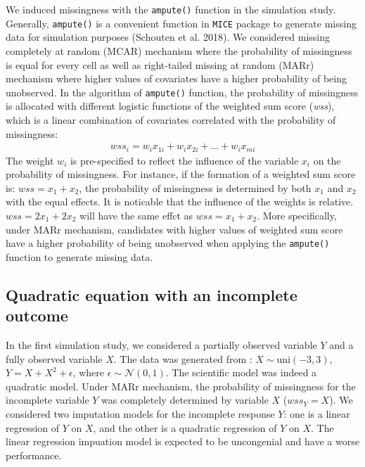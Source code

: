 \documentclass[12pt, fullpage, a4paper]{article}
\begin{document}
We induced missingness with the \texttt{ampute()} function in the simulation study. Generally, \texttt{ampute()} is a convenient function in \texttt{MICE} package to generate missing data for simulation purposes (Schouten et al. 2018)\nocite{Schouten2018}. We considered missing completely at random (MCAR) mechanism where the probability of missingness is equal for every cell as well as right-tailed missing at random (MARr) mechanism where higher values of covariates have a higher probability of being unobserved. In the algorithm of \texttt{ampute()} function, the probability of missingness is allocated with different logistic functions of the weighted sum score (\emph{wss}), which is a linear combination of covariates correlated with the probability of missingness:
\begin{equation}
	\begin{array}{ll}
		wss_{i} = w_{i}x_{1i} + w_{i}x_{2i} + \dots + w_{i}x_{mi}
	\end{array} 
\end{equation}
The weight $w_i$ is pre-specified to reflect the influence of the variable $x_{i}$ on the probability of missingness. For instance, if the formation of a weighted sum score is:
$wss = x_1 + x_2$, the probability of missingness is determined by both $x_1$ and $x_2$ with the equal effects. It is noticable that the influence of the weights is relative. $wss = 2x_1 + 2x_2$ will have the same effct as $wss = x_1 + x_2$. More specifically, under MARr mechanism, candidates with higher values of weighted sum score have a higher probability of being unobserved when applying the \texttt{ampute()} function to generate missing data. 

  

\subsection{Quadratic equation with an incomplete outcome}
In the first simulation study, we considered a partially observed variable $Y$ and a fully observed variable $X$. The data was generated from : $X \sim \text{uni}(-3, 3)$, $Y = X + X^2 + \epsilon$, where $\epsilon \sim \mathcal{N}(0, 1)$. The scientific model was indeed a quadratic model. Under MARr mechanism, the probability of missingness for the incomplete variable $Y$ was completely determined by variable $X$ ($wss_{Y} = X$). We considered two imputation models for the incomplete response $Y$: one is a linear regression of $Y$ on $X$, and the other is a quadratic regression of $Y$ on $X$. The linear regression impuation model is expected to be uncongenial and have a worse performance.  
\end{document}
